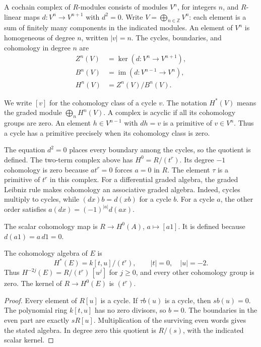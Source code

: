 \begin{definition}\label{def:rel-complex}
A cochain complex of $R$-modules consists of modules $V^n$, for integers
$n$, and $R$-linear maps $d:V^n\to V^{n+1}$ with $d^2=0$.
Write $V=\bigoplus_{n\in\mathbb Z}V^n$: each element is a sum of
finitely many components in the indicated modules.
An element of $V^n$ is homogeneous of degree $n$, written $|v|=n$.
The cycles, boundaries, and cohomology in degree $n$ are
\[
 \begin{split}
 Z^n(V)&=\ker(d:V^n\longrightarrow V^{n+1}),\\
 B^n(V)&=\operatorname{im}(d:V^{n-1}\longrightarrow V^n),\\
 H^n(V)&=Z^n(V)/B^n(V).
 \end{split}
\]

We write $[v]$ for the cohomology class of a cycle $v$.
The notation $H^*(V)$ means the graded module $\bigoplus_n H^n(V)$.
A complex is acyclic if all its cohomology groups are zero.
An element $h\in V^{n-1}$ with $dh=v$ is a primitive of $v\in V^n$.
Thus a cycle has a primitive precisely when its cohomology class is zero.
\end{definition}

The equation $d^2=0$ places every boundary among the cycles, so the quotient
is defined. The two-term complex above has $H^0=R/(t^r)$.
Its degree $-1$ cohomology is zero because $at^r=0$ forces $a=0$ in $R$.
The element $\tau$ is a primitive of $t^r$ in this complex.
For a differential graded algebra, the graded Leibniz rule makes
cohomology an associative graded algebra.
Indeed, cycles multiply to cycles, while $(dx)b=d(xb)$ for a cycle $b$.
For a cycle $a$, the other order satisfies $a(dx)=(-1)^{|a|}d(ax)$.

The scalar cohomology map is $R\to H^0(A)$, $a\mapsto[a1]$.
It is defined because $d(a1)=a\,d1=0$.

\begin{proposition}\label{prop:rel-state-cohomology}
The cohomology algebra of $E$ is
\[
 H^*(E)=k[t,u]/(t^r),\qquad |t|=0,\quad |u|=-2.
\]
Thus $H^{-2j}(E)=R/(t^r)\,[u^j]$ for $j\geq0$, and every other
cohomology group is zero. The kernel of $R\to H^0(E)$ is $(t^r)$.
\end{proposition}

\begin{proof}
Every element of $R[u]$ is a cycle. If $\tau b(u)$ is a cycle, then
$s b(u)=0$. The polynomial ring $k[t,u]$ has no zero divisors, so $b=0$.
The boundaries in the even part are exactly $sR[u]$.
Multiplication of the surviving even words gives the stated algebra.
In degree zero this quotient is $R/(s)$, with the indicated scalar kernel.
\end{proof}

